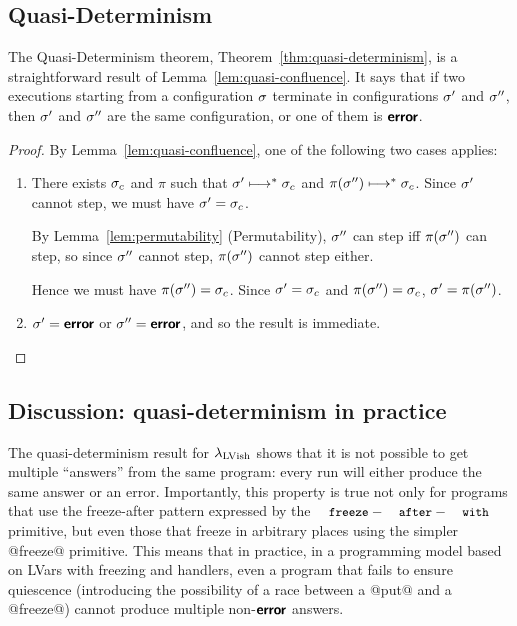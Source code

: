 \subsection{Quasi-Determinism}\label{subsection:quasi-quasi-determinism}

The Quasi-Determinism theorem, Theorem~\ref{thm:quasi-determinism}, is
a straightforward result of Lemma~\ref{lem:quasi-confluence}.  It says
that if two executions starting from a configuration $\sigma$ terminate
in configurations $\sigma'$ and $\sigma''$, then $\sigma'$ and $\sigma''$
are the same configuration, or one of them is $\textbf{\textsf{error}}$.

\ThmQuasiDeterminism
\ifdefined\DISSERTATION
\begin{proof}
  By Lemma~\ref{lem:quasi-confluence}, one of the following two cases
  applies:
  \begin{enumerate}
    \item There exists $\sigma_c$ and $\pi$ such that $\sigma'
      \longmapsto^* \sigma_c$ and $\pi(\sigma'') \longmapsto^* \sigma_c$.
      Since $\sigma'$ cannot step, we must have $\sigma' = \sigma_c$.

      By Lemma~\ref{lem:permutability} (Permutability), $\sigma''$ can
      step iff $\pi(\sigma'')$ can step, so since $\sigma''$ cannot
      step, $\pi(\sigma'')$ cannot step either.

      Hence we must have $\pi(\sigma'') = \sigma_c$.  Since $\sigma' =
      \sigma_c$ and $\pi(\sigma'') = \sigma_c$, $\sigma' = \pi(\sigma'')$.
    \item $\sigma' = \textbf{\textsf{error}}$ or $\sigma'' = \textbf{\textsf{error}}$, and so the result
      is immediate.
  \end{enumerate}
\end{proof}
\fi

\subsection{Discussion: quasi-determinism in practice}


The quasi-determinism result for $\lambda_{\textrm{LVish}}$ shows that it is not
possible to get multiple ``answers'' from the same program: every run
will either produce the same answer or an error.  Importantly, this
property is true not only for programs that use the freeze-after
pattern expressed by the $\FAW$ primitive, but even those that freeze
in arbitrary places using the simpler @freeze@ primitive.  This means
that in practice, in a programming model based on LVars with freezing
and handlers, even a program that fails to ensure quiescence
(introducing the possibility of a race between a @put@ and a
@freeze@) cannot produce multiple non-$\textbf{\textsf{error}}$ answers.

